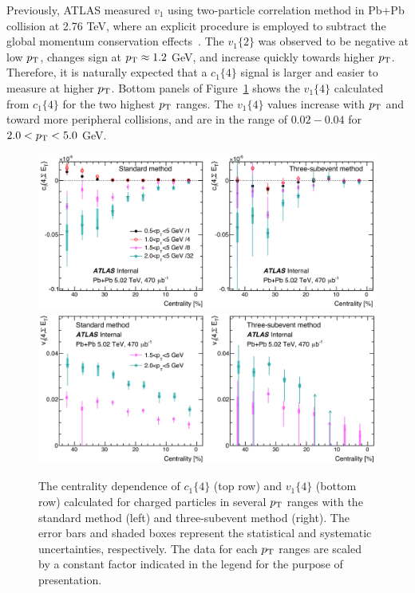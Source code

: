 Previously, ATLAS measured $v_1$ using two-particle correlation method in Pb+Pb collision at 2.76 TeV, where an explicit procedure is employed to subtract the global momentum conservation effects~\cite{ATLAS:2012at}. The $v_1\{2\}$ was observed to be negative at low $p_\text{T}$, changes sign at $p_\text{T} \approx 1.2$ GeV, and increase quickly towards higher $p_\text{T}$. Therefore, it is naturally expected that a $c_1\{4\}$ signal is larger and easier to measure at higher $p_\text{T}$. Bottom panels of Figure~\ref{fig:centfluc_ATLAS_v1_4pc} shows the $v_1\{4\}$ calculated from $c_1\{4\}$ for the two highest $p_\text{T}$ ranges. The $v_1\{4\}$ values increase with $p_\text{T}$ and toward more peripheral collisions, and are in the range of $0.02-0.04$ for $2.0<p_\text{T}<5.0$ GeV.

\begin{figure}[H]
\centering
\includegraphics[width=.95\linewidth]{figs/chapter_centfluc/ATLAS_c1_4pc.png}
\includegraphics[width=.95\linewidth]{figs/chapter_centfluc/ATLAS_v1_4pc.png}
\caption{The centrality dependence of $c_1\{4\}$ (top row) and $v_1\{4\}$ (bottom row) calculated for charged particles in several $p_\text{T}$ ranges with the standard method (left) and three-subevent method (right). The error bars and shaded boxes represent the statistical and systematic uncertainties, respectively. The data for each $p_\text{T}$ ranges are scaled by a constant factor indicated in the legend for the purpose of presentation.}
\label{fig:centfluc_ATLAS_v1_4pc}
\end{figure}




